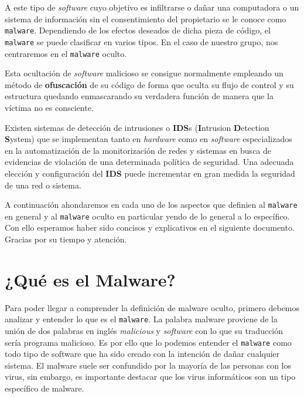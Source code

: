 \documentclass[12pt]{article}
\newcommand{\newpar} {
    \vskip 0.5cm
}
\begin{document}
        \newpar

        A este tipo de \textit{software} cuyo objetivo es infiltrarse o dañar una computadora o un sistema de información sin el consentimiento del propietario se le conoce como 
        \texttt{malware}. Dependiendo de los efectos deseados de dicha pieza de código, el \texttt{malware} se puede clasificar en varios tipos. En el caso de nuestro grupo, nos centraremos en el \texttt{malware} oculto.

        \newpar

        Esta ocultación de \textit{software} malicioso se consigue normalmente empleando un método de \textbf{ofuscación} de su código de forma que oculta su flujo de control y su estructura quedando enmascarando su verdadera función de manera que la víctima no es consciente.

        \newpar

        Existen sistemas de detección de intrusiones o \textbf{IDS}s (\textbf{I}ntrusion \textbf{D}etection \textbf{S}ystem) que se implementan tanto en \textit{hardware} como en \textit{software} especializados en la automatización de la monitorización de redes y sistemas en busca de evidencias de violación de una determinada política de seguridad. Una adecuada elección y configuración del \textbf{IDS} puede incrementar en gran medida la seguridad de una red o sistema.

        \newpar

        A continuación ahondaremos en cada uno de los aspectos que definien al \texttt{malware} en general y al \texttt{malware} oculto en particular yendo de lo general a lo específico. Con ello esperamos haber sido concisos y explicativos en el siguiente documento. Gracias por su tiempo y atención.

    \section{¿Qué es el Malware?}
        Para poder llegar a comprender la definición de malware oculto, primero debemos analizar y entender lo que es el \texttt{malware}. La palabra malware proviene de la unión de dos palabras en inglés \textit{malicious} y \textit{software} con lo que su traducción sería programa malicioso. Es por ello que lo podemos entender el \texttt{malware} como todo tipo de software que ha sido creado con la intención de dañar cualquier sistema. El malware suele ser confundido por la mayoría de las personas con los virus, sin embargo, es importante destacar que los virus informáticos son un tipo específico de malware.
\end{document}
